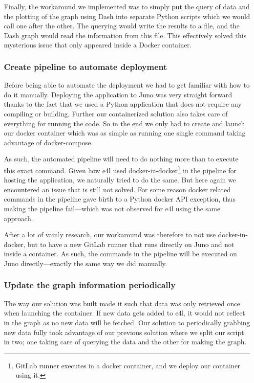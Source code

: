 Finally, the workaround we implemented was to simply put the query of
data and the plotting of the graph using Dash into separate Python
scripts which we would call one after the other. The querying would
write the results to a file, and the Dash graph would read the
information from this file. This effectively solved this mysterious
issue that only appeared inside a Docker container.

\subsubsection{Create pipeline to automate deployment}

Before being able to automate the deployment we had to get familiar
with how to do it manually. Deploying the application to Juno was very
straight forward thanks to the fact that we used a Python application
that does not require any compiling or building. Further our
containerized solution also takes care of everything for running the
code. So in the end we only had to create and launch our docker
container which was as simple as running one single command taking
advantage of docker-compose.

As such, the automated pipeline will need to do nothing more than to
execute this exact command. Given how \gls{e4l} used
docker-in-docker\footnote{GitLab runner executes in a docker
container, and we deploy our container using it.} in the pipeline for
hosting the application, we naturally tried to do the same. But here
again we encountered an issue that is still not solved. For some
reason docker related commands in the pipeline gave birth to a Python docker API
exception, thus making the pipeline fail---which was not observed for
\gls{e4l} using the same approach.

After a lot of vainly research, our workaround was therefore to not
use docker-in-docker, but to have a new GitLab runner that runs
directly on Juno and not inside a container. As such, the commands in
the pipeline will be executed on Juno directly---exactly the same way
we did manually.

\subsubsection{Update the graph information periodically}

The way our solution was built made it such that data was only
retrieved once when launching the container. If new data gets added to
\gls{e4l}, it would not reflect in the graph as no new data will be
fetched. Our solution to periodically grabbing new data fully took
advantage of our previous solution where we split our script in two;
one taking care of querying the data and the other for making the
graph.


